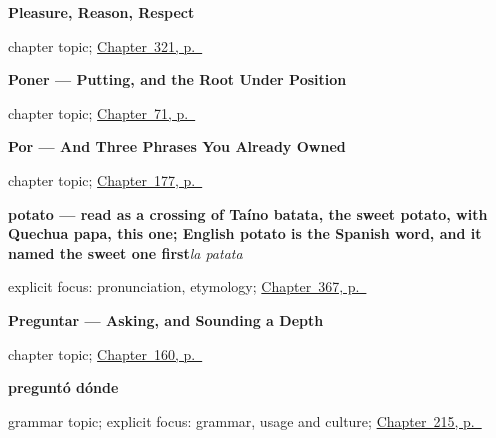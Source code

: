 \noindent\begin{minipage}[t]{\linewidth}
\raggedright
\textbf{Pleasure, Reason, Respect}\par
\footnotesize chapter topic; \hyperref[ch:placer-y-consejo]{Chapter~321, p.~\pageref*{ch:placer-y-consejo}}
\end{minipage}\par\smallskip

\noindent\begin{minipage}[t]{\linewidth}
\raggedright
\textbf{Poner --- Putting, and the Root Under Position}\par
\footnotesize chapter topic; \hyperref[ch:spanish-poner]{Chapter~71, p.~\pageref*{ch:spanish-poner}}
\end{minipage}\par\smallskip

\noindent\begin{minipage}[t]{\linewidth}
\raggedright
\textbf{Por --- And Three Phrases You Already Owned}\par
\footnotesize chapter topic; \hyperref[ch:por]{Chapter~177, p.~\pageref*{ch:por}}
\end{minipage}\par\smallskip

\noindent\begin{minipage}[t]{\linewidth}
\raggedright
\textbf{potato — read as a crossing of Taíno batata, the sweet potato, with Quechua papa, this one; English potato is the Spanish word, and it named the sweet one first}\enspace\emph{la patata}\par
\footnotesize explicit focus: pronunciation, etymology; \hyperref[ch:el-desayuno-y-la-fruta]{Chapter~367, p.~\pageref*{ch:el-desayuno-y-la-fruta}}
\end{minipage}\par\smallskip

\noindent\begin{minipage}[t]{\linewidth}
\raggedright
\textbf{Preguntar — Asking, and Sounding a Depth}\par
\footnotesize chapter topic; \hyperref[ch:spanish-preguntar]{Chapter~160, p.~\pageref*{ch:spanish-preguntar}}
\end{minipage}\par\smallskip

\noindent\begin{minipage}[t]{\linewidth}
\raggedright
\textbf{preguntó dónde}\par
\footnotesize grammar topic; explicit focus: grammar, usage and culture; \hyperref[ch:pregunto-donde]{Chapter~215, p.~\pageref*{ch:pregunto-donde}}
\end{minipage}\par\smallskip

